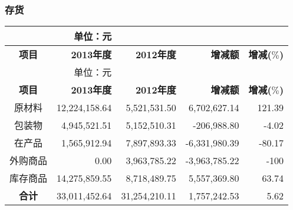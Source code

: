 \subsubsection{存货}
\renewcommand*{\arraystretch}{0.8}
\setlength{\tabcolsep}{8pt}
\begin{longtable}{>{\footnotesize}c>{\footnotesize}r>{\footnotesize}r>{\footnotesize}r>{\footnotesize}r}
 \multicolumn{4}{c}{\footnotesize \bfseries 存货} & {\scriptsize 单位：元}\\
\hline\hline
\rowcolor{mycyan} {\bfseries \footnotesize  项目} & {\bfseries \footnotesize  2013年度}\hspace{2ex} & {\bfseries \footnotesize   2012年度}\hspace{2ex} &  {\bfseries \footnotesize  增减额}\hspace{4ex}      & {\bfseries \footnotesize  增减($\%$)} \\  \endfirsthead          %
 \multicolumn{4}{c}{\footnotesize \bfseries 存货（续表）} & {\scriptsize 单位：元}\\               %
\hline\hline
\rowcolor{mycyan} {\bfseries \footnotesize  项目} & {\bfseries \footnotesize  2013年度}\hspace{2ex} & {\bfseries \footnotesize   2012年度}\hspace{2ex} &  {\bfseries \footnotesize  增减额}\hspace{4ex}      & {\bfseries \footnotesize  增减($\%$)}  \\  \endhead                %
\hline
\endfoot
\hline   %
原材料 & 12,224,158.64 & 5,521,531.50 & 6,702,627.14 & 121.39\\
包装物 & 4,945,521.51 & 5,152,510.31 & -206,988.80 & -4.02\\
在产品 & 1,565,912.94 & 7,897,893.33 & -6,331,980.39 & -80.17\\
外购商品 & 0.00 & 3,963,785.22 & -3,963,785.22 & -100\\
库存商品 & 14,275,859.55 & 8,718,489.75 & 5,557,369.80 & 63.74\\
\midrule
\bfseries 合计 & 33,011,452.64 & 31,254,210.11 & 1,757,242.53 & 5.62\\
\bottomrule
\end{longtable}

